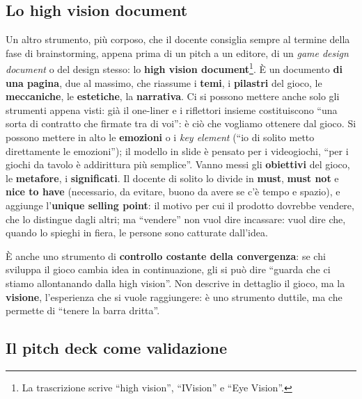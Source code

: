 \subsection{Lo high vision document}



Un altro strumento, più corposo, che il docente consiglia sempre al termine della fase di
brainstorming, appena prima di un pitch a un editore, di un \emph{game design document} o
del design stesso: lo \textbf{high vision document}\footnote{La trascrizione scrive
``high vision'', ``IVision'' e ``Eye Vision''.}. È un documento \textbf{di una pagina},
due al massimo, che riassume i \textbf{temi}, i \textbf{pilastri} del gioco, le
\textbf{meccaniche}, le \textbf{estetiche}, la \textbf{narrativa}. Ci si possono mettere
anche solo gli strumenti appena visti: già il one-liner e i riflettori insieme
costituiscono ``una sorta di contratto che firmate tra di voi'': è ciò che vogliamo ottenere
dal gioco. Si possono mettere in alto le \textbf{emozioni} o i \emph{key element} (``io di
solito metto direttamente le emozioni''); il modello in slide è pensato per i videogiochi,
``per i giochi da tavolo è addirittura più semplice''. Vanno messi gli \textbf{obiettivi}
del gioco, le \textbf{metafore}, i \textbf{significati}. Il docente di solito lo divide in
\textbf{must}, \textbf{must not} e \textbf{nice to have} (necessario, da evitare, buono da
avere se c'è tempo e spazio), e aggiunge l'\textbf{unique selling point}: il motivo per cui
il prodotto dovrebbe vendere, che lo distingue dagli altri; ma ``vendere'' non vuol dire
incassare: vuol dire che, quando lo spieghi in fiera, le persone sono catturate dall'idea.

È anche uno strumento di \textbf{controllo costante della convergenza}: se chi sviluppa il
gioco cambia idea in continuazione, gli si può dire ``guarda che ci stiamo allontanando
dalla high vision''. Non descrive in dettaglio il gioco, ma la \textbf{visione},
l'esperienza che si vuole raggiungere: è uno strumento duttile, ma che permette di
``tenere la barra dritta''.

\subsection{Il pitch deck come validazione}



